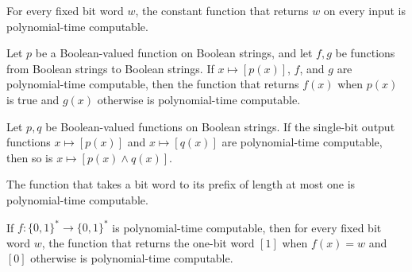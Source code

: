 \begin{lemma}
\label{Complexity.clA5_pt_const}
\leanok
{}
For every fixed bit word $w$, the constant function that returns $w$ on every input is
polynomial-time computable.
\end{lemma}

\begin{lemma}
\label{Complexity.clA5_pt_cond}
\leanok
{}
Let $p$ be a Boolean-valued function on Boolean strings, and let $f,g$ be functions from
Boolean strings to Boolean strings. If $x\mapsto[p(x)]$, $f$, and $g$ are
polynomial-time computable, then the function that returns $f(x)$ when $p(x)$ is true
and $g(x)$ otherwise is polynomial-time computable.
\end{lemma}

\begin{lemma}
\label{Complexity.clA5_pt_and}
\leanok
{}
Let $p,q$ be Boolean-valued functions on Boolean strings. If the single-bit output
functions $x\mapsto[p(x)]$ and $x\mapsto[q(x)]$ are polynomial-time computable, then so
is $x\mapsto[p(x)\land q(x)]$.
\end{lemma}

\begin{lemma}
\label{Complexity.clA5_pt_head}
\leanok
{}
The function that takes a bit word to its prefix of length at most one is
polynomial-time computable.
\end{lemma}

\begin{lemma}
\label{Complexity.clA5_pt_eq}
\leanok
{}
If $f : \{0,1\}^* \to \{0,1\}^*$ is polynomial-time computable, then for every fixed bit
word $w$, the function that returns the one-bit word $[1]$ when $f(x)=w$ and $[0]$
otherwise is polynomial-time computable.
\end{lemma}

